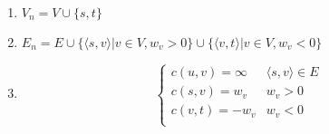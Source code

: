 \begin{enumerate}
	\item $V_n=V \cup \{s, t\}$
	\item $E_n=E \cup \{\langle s, v \rangle | v \in V, w_v>0\} \cup \{\langle v, t \rangle | v \in V, w_v<0\}$
	\item \[ \begin{cases}
		c(u, v)=\infty & \langle s, v \rangle \in E \\
		c(s, v)=w_v & w_v>0 \\
		c(v, t)=-w_v & w_v<0 \\
	\end{cases} \]
\end{enumerate}

